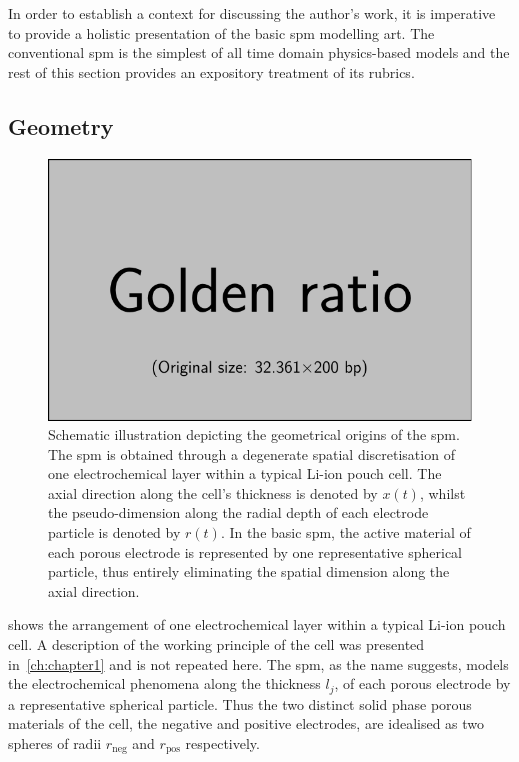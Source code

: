 
In  order  to establish  a  context  for discussing  the  author's  work, it  is
imperative to provide  a holistic presentation of the  basic \gls{spm} modelling
art. The conventional \gls{spm} is the simplest of all time domain physics-based
models and  the rest  of this  section provides an  expository treatment  of its
rubrics.

\subsection{Geometry}\label{subsec:basicspmgeometry}

\begin{figure}[h]
    \centering
    \includegraphics[width=\textwidth]{placeholder_images/example-image-golden.pdf}
    \caption[Schematic illustration depicting geometrical origins of the \gls{spm}]
    {Schematic illustration depicting the geometrical origins of the \gls{spm}. The \gls{spm} is obtained through a degenerate spatial discretisation of one electrochemical layer within a typical Li-ion pouch cell. The axial direction along the cell's thickness is denoted by $x(t)$, whilst the pseudo-dimension along the radial depth of each electrode particle is denoted by $r(t)$. In the basic \gls{spm}, the active material of each porous electrode is represented by one representative spherical particle, thus entirely eliminating the spatial dimension along the axial direction.}
    \label{fig:sandwichtospm}
\end{figure}


  shows the  arrangement  of  one electrochemical  layer
within a  typical Li-ion pouch cell.  A description of the  working principle of
the  cell was  presented in~\cref{ch:chapter1}  and  is not  repeated here.  The
\gls{spm}, as the name suggests,  models the electrochemical phenomena along the
thickness  $l_j$, \jinnegpos{}  of  each porous  electrode  by a  representative
spherical particle.  Thus the two distinct  solid phase porous materials  of the
cell, \ie{} the  negative and positive electrodes, are idealised  as two spheres
of radii $r_\text{neg}$ and $r_\text{pos}$ respectively.



